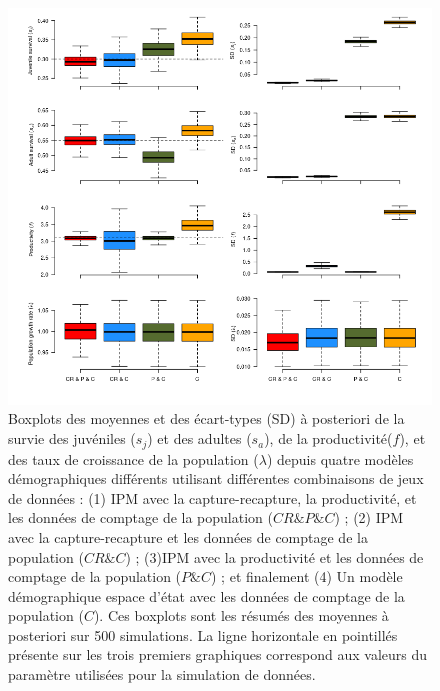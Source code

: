 \documentclass[12pt,a4paper]{article}
\begin{document}
\begin{figure}[!t]
\includegraphics[width=17cm]{500sim_Counts_28062022.png}
\caption{Boxplots des moyennes et des écart-types (SD) à posteriori de la survie des juvéniles ($s_j$) et des adultes ($s_a$), de la productivité($f$), et des taux de croissance de la population ($\lambda$) depuis quatre modèles démographiques différents utilisant différentes combinaisons de jeux de données : (1) IPM avec la capture-recapture, la productivité, et les données de comptage de la population ($CR \& P \& C$) ; (2) IPM avec la capture-recapture et les données de comptage de la population ($CR \& C$) ; (3)IPM avec la productivité et les données de comptage de la population ($P \& C$) ; et finalement (4) Un modèle démographique espace d'état avec les données de comptage de la population ($C$). Ces boxplots sont les résumés des moyennes à posteriori sur 500 simulations. La ligne horizontale en pointillés présente sur les trois premiers graphiques correspond aux valeurs du paramètre utilisées pour la simulation de données.}
\end{figure}
\end{document}
